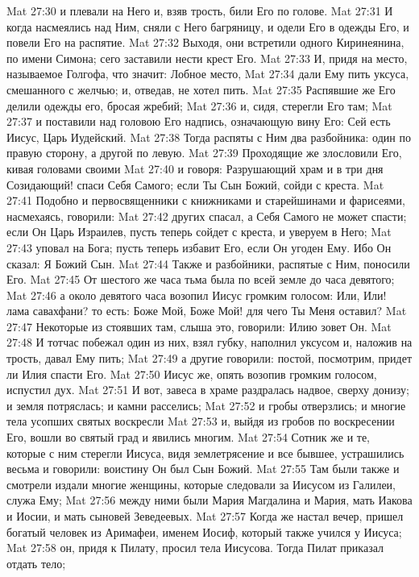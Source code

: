 Mat 27:30  и плевали на Него и, взяв трость, били Его по голове.
Mat 27:31  И когда насмеялись над Ним, сняли с Него багряницу, и одели Его в одежды Его, и повели Его на распятие.
Mat 27:32  Выходя, они встретили одного Киринеянина, по имени Симона; сего заставили нести крест Его.
Mat 27:33  И, придя на место, называемое Голгофа, что значит: Лобное место,
Mat 27:34  дали Ему пить уксуса, смешанного с желчью; и, отведав, не хотел пить.
Mat 27:35  Распявшие же Его делили одежды его, бросая жребий;
Mat 27:36  и, сидя, стерегли Его там;
Mat 27:37  и поставили над головою Его надпись, означающую вину Его: Сей есть Иисус, Царь Иудейский.
Mat 27:38  Тогда распяты с Ним два разбойника: один по правую сторону, а другой по левую.
Mat 27:39  Проходящие же злословили Его, кивая головами своими
Mat 27:40  и говоря: Разрушающий храм и в три дня Созидающий! спаси Себя Самого; если Ты Сын Божий, сойди с креста.
Mat 27:41  Подобно и первосвященники с книжниками и старейшинами и фарисеями, насмехаясь, говорили:
Mat 27:42  других спасал, а Себя Самого не может спасти; если Он Царь Израилев, пусть теперь сойдет с креста, и уверуем в Него;
Mat 27:43  уповал на Бога; пусть теперь избавит Его, если Он угоден Ему. Ибо Он сказал: Я Божий Сын.
Mat 27:44  Также и разбойники, распятые с Ним, поносили Его.
Mat 27:45  От шестого же часа тьма была по всей земле до часа девятого;
Mat 27:46  а около девятого часа возопил Иисус громким голосом: Или, Или! лама савахфани? то есть: Боже Мой, Боже Мой! для чего Ты Меня оставил?
Mat 27:47  Некоторые из стоявших там, слыша это, говорили: Илию зовет Он.
Mat 27:48  И тотчас побежал один из них, взял губку, наполнил уксусом и, наложив на трость, давал Ему пить;
Mat 27:49  а другие говорили: постой, посмотрим, придет ли Илия спасти Его.
Mat 27:50  Иисус же, опять возопив громким голосом, испустил дух.
Mat 27:51  И вот, завеса в храме раздралась надвое, сверху донизу; и земля потряслась; и камни расселись;
Mat 27:52  и гробы отверзлись; и многие тела усопших святых воскресли
Mat 27:53  и, выйдя из гробов по воскресении Его, вошли во святый град и явились многим.
Mat 27:54  Сотник же и те, которые с ним стерегли Иисуса, видя землетрясение и все бывшее, устрашились весьма и говорили: воистину Он был Сын Божий.
Mat 27:55  Там были также и смотрели издали многие женщины, которые следовали за Иисусом из Галилеи, служа Ему;
Mat 27:56  между ними были Мария Магдалина и Мария, мать Иакова и Иосии, и мать сыновей Зеведеевых.
Mat 27:57  Когда же настал вечер, пришел богатый человек из Аримафеи, именем Иосиф, который также учился у Иисуса;
Mat 27:58  он, придя к Пилату, просил тела Иисусова. Тогда Пилат приказал отдать тело;
